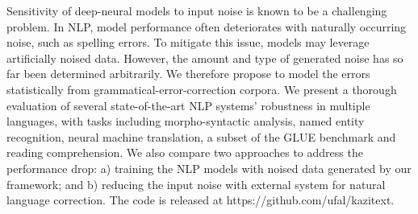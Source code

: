 Sensitivity of deep-neural models to input noise is known to be a challenging problem. In NLP, model performance often deteriorates with naturally occurring noise, such as spelling errors. To mitigate this issue, models may leverage artificially noised data. However, the amount and type of generated noise has so far been determined arbitrarily. We therefore propose to model the errors statistically from grammatical-error-correction corpora. We present a thorough evaluation of several state-of-the-art NLP systems' robustness in multiple languages, with tasks including morpho-syntactic analysis, named entity recognition, neural machine translation, a subset of the GLUE benchmark and reading comprehension. We also compare two approaches to address the performance drop: a) training the NLP models with noised data generated by our framework; and b) reducing the input noise with external system for natural language correction. The code is released at https://github.com/ufal/kazitext.
